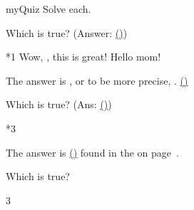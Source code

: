 \documentclass{article}
\begin{document}
\begin{quiz*}{myQuiz}
Solve each.
\begin{questions}

    \item Which is true? (Answer: \hyperref[rtAns3]{()})
\begin{manswers}*{1}
\bChoices[random=true,label=rtAns]
    \label{rtAns3} \eAns
     Wow, , this is great!\eAns
     \eAns
     \eAns
\eFreeze
     Hello mom!\eAns
\eChoices
\end{manswers}
\begin{solution}
The answer is , or to be more precise,
. \hyperref[rtAns3]{()}
\end{solution}

    \item Which is true? (Ans: \hyperref[rtAns1]{()})
\begin{answers}*{3}
    \bChoices[random,nCols=2]
        \label{rtAns1} \eAns
         \eAns
         \eAns
         \eAns
    \eChoices
\end{answers}
\begin{solution}
The answer is \hyperref[rtAns1]{()} found in the
 on page~\pageref{rtAns1}.
\end{solution}

    \item Which is true?
\begin{answers}{3}
    \bChoices[random]
         \eAns
         \eAns
         \eAns
         \eAns
    \eChoices
\end{answers}
\end{questions}
\end{quiz*}\quad\ScoreField\currQuiz\CorrButton\currQuiz
\end{document}
